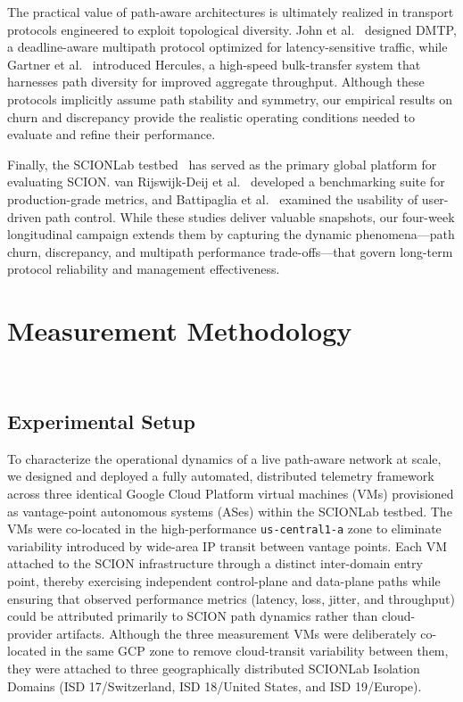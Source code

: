 \documentclass[pdflatex,sn-vancouver-num]{sn-jnl}%
\theoremstyle{thmstyleone}%
\theoremstyle{thmstyletwo}%
\theoremstyle{thmstylethree}%
\begin{document}
    The practical value of path-aware architectures is ultimately realized in transport protocols engineered to exploit topological diversity. John et al.~\cite{john2023dmtp} designed DMTP, a deadline-aware multipath protocol optimized for latency-sensitive traffic, while Gartner et al.~\cite{gartner2023hercules} introduced Hercules, a high-speed bulk-transfer system that harnesses path diversity for improved aggregate throughput. Although these protocols implicitly assume path stability and symmetry, our empirical results on churn and discrepancy provide the realistic operating conditions needed to evaluate and refine their performance.
    
    Finally, the SCIONLab testbed~\cite{kwon2020scionlab} has served as the primary global platform for evaluating SCION. van Rijswijk-Deij et al.~\cite{vanrijswijk2023sciontestbed} developed a benchmarking suite for production-grade metrics, and Battipaglia et al.~\cite{battipaglia2023evaluation} examined the usability of user-driven path control. While these studies deliver valuable snapshots, our four-week longitudinal campaign extends them by capturing the dynamic phenomena—path churn, discrepancy, and multipath performance trade-offs—that govern long-term protocol reliability and management effectiveness.

   \section{Measurement Methodology}~\label{sec::methodology}

    \subsection{Experimental Setup}
    To characterize the operational dynamics of a live path-aware network at scale, we designed and deployed a fully automated, distributed telemetry framework across three identical Google Cloud Platform virtual machines (VMs) provisioned as vantage-point autonomous systems (ASes) within the SCIONLab testbed. 
    The VMs were co-located in the high-performance \texttt{us-central1-a} zone to eliminate variability introduced by wide-area IP transit between vantage points. 
    Each VM attached to the SCION infrastructure through a distinct inter-domain entry point, thereby exercising independent control-plane and data-plane paths while ensuring that observed performance metrics (latency, loss, jitter, and throughput) could be attributed primarily to SCION path dynamics rather than cloud-provider artifacts. Although the three measurement VMs were deliberately co-located in the same GCP zone to remove cloud-transit variability between them, they were attached to three geographically distributed SCIONLab Isolation Domains (ISD 17/Switzerland, ISD 18/United States, and ISD 19/Europe).
\end{document}
